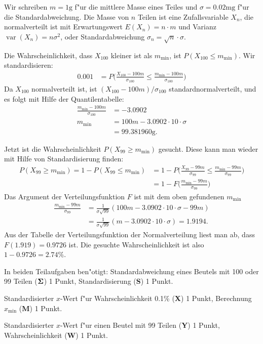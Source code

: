\begin{loesung}
Wir schreiben $m=1\text{g}$ f"ur die mittlere Masse eines Teiles und
$\sigma=0.02\text{mg}$ f"ur die Standardabweichung.
Die Masse von $n$ Teilen ist eine Zufallsvariable $X_n$, die normalverteilt
ist mit Erwartungswert $E(X_n)=n\cdot m$ und Varianz
$\operatorname{var}(X_n)=n\sigma^2$, oder Standardabweichung
$\sigma_n=\sqrt{n}\cdot\sigma$.
\begin{teilaufgaben}
\item Die Wahrscheinlichkeit, dass $X_{100}$ kleiner ist als $m_{\text{min}}$,
ist
\(
P(X_{100}\le m_{\text{min}})
\). Wir standardisieren:
\begin{align*}
0.001 &= P\biggl(
\frac{X_{100}-100m}{\sigma_{100}}\le \frac{m_{\text{min}}-100m}{\sigma_{100}}
\biggr)
\end{align*}
Da $X_{100}$ normalverteilt ist, ist $(X_{100}-100m)/\sigma_{100}$
standardnormalverteilt, und es folgt mit Hilfe der Quantilentabelle:
\begin{align*}
\frac{m_{\text{min}}-100m}{\sigma_{100}}&=-3.0902\\
m_{\text{min}}&=100m-3.0902\cdot 10\cdot \sigma
\\
&=99.381960\text{g}.
\end{align*}
\item Jetzt ist die Wahrscheinlichkeit $P(X_{99} \ge m_{\text{min}})$ gesucht.
Diese kann man wieder mit Hilfe von Standardisierung finden:
\begin{align*}
P(X_{99} \ge m_{\text{min}})
=
1-P(X_{99} \le m_{\text{min}})
&=
1-P\biggl(
\frac{X_{99}-99m}{\sigma_{99}}\le \frac{m_{\text{min}} - 99m}{\sigma_{99}}
\biggr)
\\
&=1-F\biggl(
\frac{m_{\text{min}} - 99m}{\sigma_{99}}
\biggr)
\end{align*}
Das Argument der Verteilungsfunktion $F$ ist mit dem oben gefundenen
$m_{\text{min}}$
\begin{align*}
\frac{m_{\text{min}} - 99m}{\sigma_{99}}
&=
\frac1{\sigma\sqrt{99}}(
100m-3.0902\cdot 10\cdot \sigma-99m)\\
&=
\frac1{\sigma\sqrt{99}}(m-3.0902\cdot 10\cdot \sigma)
=1.9194.
\end{align*}
Aus der Tabelle der Verteilungsfunktion der Normalverteilung liest man
ab, dass $F(1.919)=0.9726$ ist. Die gesuchte Wahrscheinlichkeit ist
also $1-0.9726=2.74\%$.
\end{teilaufgaben}
\end{loesung}

\begin{bewertung}
In beiden Teilaufgaben ben"otigt:
Standardabweichung eines Beutels  mit 100 oder 99 Teilen
($\bf \Sigma$) 1 Punkt,
Standardisierung (\textbf{S}) 1 Punkt.
\begin{teilaufgaben}
\item
Standardisierter $x$-Wert f"ur Wahrscheinlichkeit 0.1\% (\textbf{X}) 1 Punkt,
Berechnung $x_{\text{min}}$ (\textbf{M}) 1 Punkt.
\item
Standardisierter $x$-Wert f"ur einen Beutel mit 99 Teilen (\textbf{Y}) 1 Punkt,
Wahrscheinlichkeit (\textbf{W}) 1 Punkt.
\end{teilaufgaben}
\end{bewertung}

